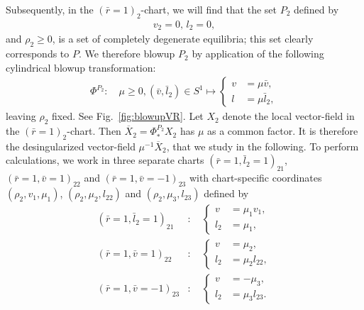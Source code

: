 \documentclass[reqno,12pt]{amsart}
\newcommand{\eqlab}[1]{\label{eq:#1}}
\renewcommand{\eqref}[1]{(\ref{eq:#1})}
\newcommand{\figref}[1]{Fig.~\ref{fig:#1}}
\numberwithin{equation}{section}
\begin{document}
Subsequently, in the $(\bar r=1)_2$-chart, we will find that the set $P_2$ defined by
\begin{align*}
 v_2=0,\,l_2=0,
\end{align*}
and $\rho_2\ge 0$,
is a set of completely degenerate equilibria; this set clearly corresponds to $P$. We therefore blowup $P_2$ by application of the following cylindrical blowup transformation:
\begin{align}\eqlab{phiR2}
\Phi^{P_2}:\quad  \mu\ge 0,(\bar v,\bar l_2)\in S^1\mapsto \begin{cases}
                                          v &= \mu \bar v,\\
                                          l &=\mu \bar l_2,
                                         \end{cases}
\end{align}
leaving $\rho_2$ fixed. See \figref{blowupVR}. Let $X_2$ denote the local vector-field in the $(\bar r=1)_2$-chart. Then $\overline X_2=\Phi^{P_2}_* X_2$ has $\mu$ as a common factor. It is therefore the desingularized vector-field $\mu^{-1}\overline X_2$, that we study in the following. To perform calculations, we work in three separate charts $(\bar r=1,\bar l_2=1)_{21}$, $(\bar r=1,\bar v=1)_{22}$ and $(\bar r=1,\bar v=-1)_{23}$ with chart-specific coordinates $(\rho_2,v_1,\mu_1)$, $(\rho_2,\mu_2,l_{22})$ and $(\rho_2,\mu_3,l_{23})$ defined by
\begin{align}
(\bar r=1,\bar l_2=1)_{21}&:\quad \begin{cases}
                     v&=\mu_1 v_1,\\
                     l_2&=\mu_1,
                    \end{cases}\eqlab{c21}\\
 (\bar r=1,\bar v=1)_{22}&:\quad \begin{cases}
                     v&=\mu_2,\\
                     l_2&=\mu_2 l_{22},
                    \end{cases}   \eqlab{c22} \\
                    (\bar r=1,\bar v=-1)_{23}&:\quad \begin{cases}
                     v&=-\mu_3,\\
                     l_2&=\mu_3 l_{23}.
                    \end{cases} \eqlab{c23}
\end{align}
\end{document}
